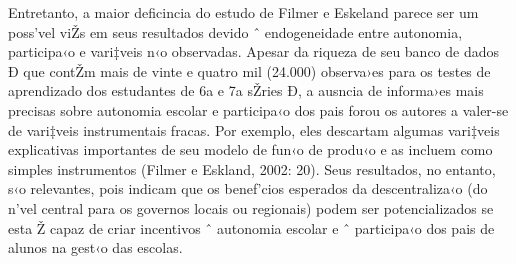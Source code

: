\documentclass[a4paper, 12pt]{article}
\begin{document}
Entretanto, a maior deficincia do estudo de Filmer e Eskeland parece ser um poss’vel viŽs em seus resultados devido ˆ endogeneidade entre autonomia, participa‹o e vari‡veis n‹o observadas. Apesar da riqueza de seu banco de dados Ð que contŽm mais de vinte e quatro mil (24.000) observa›es para os testes de aprendizado dos estudantes de 6a e 7a sŽries Ð, a ausncia de informa›es mais precisas sobre autonomia escolar e participa‹o dos pais forou os autores a valer-se de vari‡veis instrumentais fracas. Por exemplo, eles descartam algumas vari‡veis explicativas importantes de seu modelo de fun‹o de produ‹o e as incluem como simples instrumentos (Filmer e Eskland, 2002: 20). Seus resultados, no entanto, s‹o relevantes, pois indicam que os benef’cios esperados da descentraliza‹o (do n’vel central para os governos locais ou regionais) podem ser potencializados se esta Ž capaz de criar incentivos ˆ autonomia escolar e ˆ participa‹o dos pais de alunos na gest‹o das escolas.
\end{document}
